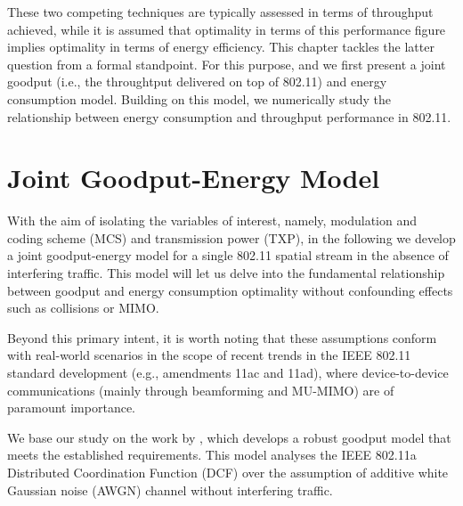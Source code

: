 \documentclass[twoside,nohyper]{tufte-book}
\begin{document}
These two competing techniques are typically assessed in terms of throughput achieved, while it is assumed that optimality in terms of this performance figure implies optimality in terms of energy efficiency. This chapter tackles the latter question from a formal standpoint. For this purpose, and we first present a joint goodput (i.e., the throughtput delivered on top of 802.11) and energy consumption model. Building on this model, we numerically study the relationship between energy consumption and throughput performance in 802.11.

\hypertarget{joint-goodput-energy-model}{%
\section{Joint Goodput-Energy Model}\label{joint-goodput-energy-model}}

With the aim of isolating the variables of interest, namely, modulation and coding scheme (MCS) and transmission power (TXP), in the following we develop a joint goodput-energy model for a single 802.11 spatial stream in the absence of interfering traffic. This model will let us delve into the fundamental relationship between goodput and energy consumption optimality without confounding effects such as collisions or MIMO.

Beyond this primary intent, it is worth noting that these assumptions conform with real-world scenarios in the scope of recent trends in the IEEE 802.11 standard development (e.g., amendments 11ac and 11ad), where device-to-device communications (mainly through beamforming and MU-MIMO) are of paramount importance.

\pagebreak

We base our study on the work by \citet{Qiao2002}\cite{Qiao2002}, which develops a robust goodput model that meets the established requirements. This model analyses the IEEE 802.11a Distributed Coordination Function (DCF) over the assumption of additive white Gaussian noise (AWGN) channel without interfering traffic.
\end{document}
